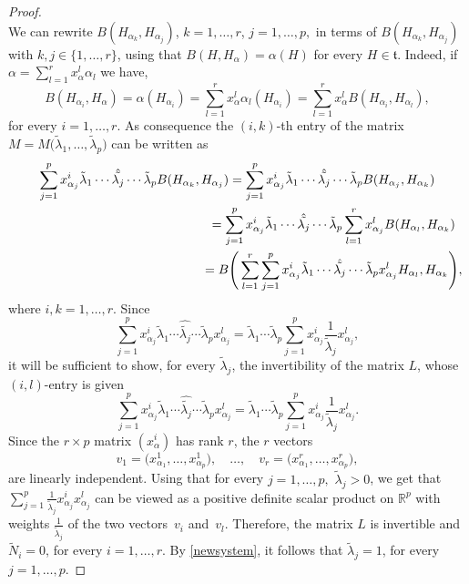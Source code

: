 \documentclass[10pt,a4paper]{amsart}
\numberwithin{equation}{section}
\begin{document}
\begin{proof}
\[\]
We can rewrite $B(H_{\alpha_k}, H_{\alpha_j})$, $k =1, \dots, r$, $j = 1, \dots, p,$ in terms of $B(H_{\alpha_k}, H_{\alpha_j})$ with $k, j \in \{1, \dots, r \}$, using
 that $B (H, H_{\alpha}) = \alpha (H)$ for every $H \in \mathfrak t$. Indeed, if $\alpha = \sum_{l=1}^r x_{\alpha}^l \alpha_l$ we have,
\[
B (H_{\alpha_i}, H_{\alpha}) = \alpha (H_{\alpha_i}) =
 \sum_{l=1}^r x_{\alpha}^l \alpha_l (H_{\alpha_i}) = \sum_{l=1}^r x_{\alpha}^l B(H_{\alpha_i}, H_{\alpha_l}),
\]
 for every $i = 1, \dots, r$.
 As consequence the $(i,k)$-th entry of the matrix $M = M\big(\tilde \lambda_1, \dots, \tilde \lambda_p\big)$ can be written as
\begin{gather*}
\sum_{j=1}^p x_{\alpha_j}^i \tilde \lambda_1 \cdots \hat{\tilde {\lambda_j}} \cdots \tilde \lambda _p B(H_{\alpha_k}, H_{\alpha_j}) = \sum_{j=1}^p x_{\alpha_j}^i \tilde \lambda_1 \cdots \hat{\tilde {\lambda_j}} \cdots \tilde \lambda _p B(H_{\alpha_j}, H_{\alpha_k})\\
\hphantom{\sum_{j=1}^p x_{\alpha_j}^i \tilde \lambda_1 \cdots \hat{\tilde {\lambda_j}} \cdots \tilde \lambda _p B(H_{\alpha_k}, H_{\alpha_j})}{} = \sum_{j=1}^p x_{\alpha_j}^i \tilde \lambda_1 \cdots \hat{\tilde {\lambda_j}} \cdots \tilde \lambda _p \sum_{l=1}^r x_{\alpha_j}^l B(H_{\alpha_l}, H_{\alpha_k})\\
 \hphantom{\sum_{j=1}^p x_{\alpha_j}^i \tilde \lambda_1 \cdots \hat{\tilde {\lambda_j}} \cdots \tilde \lambda _p B(H_{\alpha_k}, H_{\alpha_j})}{} = B\Bigg( \sum_{l=1}^r \sum_{j=1}^p x_{\alpha_j}^i \tilde \lambda_1 \cdots \hat{\tilde {\lambda_j}} \cdots \tilde \lambda _p x_{\alpha_j}^l H_{\alpha_l}, H_{\alpha_k}\Bigg),
\end{gather*}
where $i , k = 1, \dots, r$. Since
\[
 \sum_{j=1}^p x_{\alpha_j}^i \tilde \lambda_1 \cdots \hat{\tilde {\lambda_j}} \cdots \tilde \lambda _p x_{\alpha_j}^l = \tilde \lambda_1 \cdots \tilde \lambda_p \sum_{j=1}^p x_{\alpha_j}^i \frac{1} { \tilde \lambda_j} x_{\alpha_j}^l,
\]
 it will be sufficient to show, for every $ \tilde \lambda_j$, the invertibility of the matrix $L$, whose $(i,l)$-entry is given
\[
 \sum_{j=1}^p x_{\alpha_j}^i \tilde \lambda_1 \cdots \hat{\tilde {\lambda_j}} \cdots \tilde \lambda _p x_{\alpha_j}^l = \tilde \lambda_1 \cdots \tilde \lambda_p \sum_{j=1}^p x_{\alpha_j}^i \frac{1} {\tilde \lambda_j} x_{\alpha_j}^l.
\]
Since the $r \times p$ matrix $(x_{\alpha}^i)$ has rank $r$, the $r$ vectors
\[
v_1 = \big(x^1_{\alpha_1}, \dots, x^1_{\alpha_p}\big), \quad \dots, \quad v_r = \big(x^r_{\alpha_1}, \dots, x^r_{\alpha_p}\big),
\]
are linearly independent. Using that for every $j=1, \dots, p,$ $ \tilde \lambda_j > 0$, we get that $\sum_{j=1}^p \frac{1} { \tilde \lambda_j} x_{\alpha_j}^i x_{\alpha_j}^l $ can be viewed as a positive definite scalar product on $\mathbb R^p$ with weights $\frac{1}{ \tilde \lambda_j}$ of the two vectors~$v_i$ and~$v_l$. Therefore,
the matrix $L$ is invertible and $\tilde N_i =0$, for every $i = 1, \dots, r$. By \eqref{newsystem}, it follows that $\tilde \lambda_j = 1$, for every $j =1, \dots, p$.
\end{proof}
\end{document}

